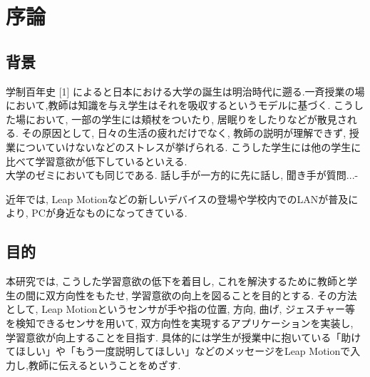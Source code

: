 \documentclass{funthesis}
\begin{document}
\chapter{序論} %


\section{背景} %


学制百年史 [1] によると日本における大学の誕生は明治時代に遡る.一斉授業の場において,教師は知識を与え学生はそれを吸収するというモデルに基づく. こうした場において, 一部の学生には頬杖をついたり, 居眠りをしたりなどが散見される. その原因として, 日々の生活の疲れだけでなく, 教師の説明が理解できず, 授業についていけないなどのストレスが挙げられる. こうした学生には他の学生に比べて学習意欲が低下しているといえる.\\
大学のゼミにおいても同じである. 話し手が一方的に先に話し, 聞き手が質問...-



近年では, Leap Motionなどの新しいデバイスの登場や学校内でのLANが普及により, PCが身近なものになってきている. 


\section{目的}
本研究では, こうした学習意欲の低下を着目し, これを解決するために教師と学生の間に双方向性をもたせ,  学習意欲の向上を図ることを目的とする. その方法として, Leap Motionというセンサが手や指の位置, 方向, 曲げ, ジェスチャー等を検知できるセンサを用いて, 双方向性を実現するアプリケーションを実装し, 学習意欲が向上することを目指す. 具体的には学生が授業中に抱いている「助けてほしい」や「もう一度説明してほしい」などのメッセージをLeap Motionで入力し,教師に伝えるということをめざす. 
\end{document}
